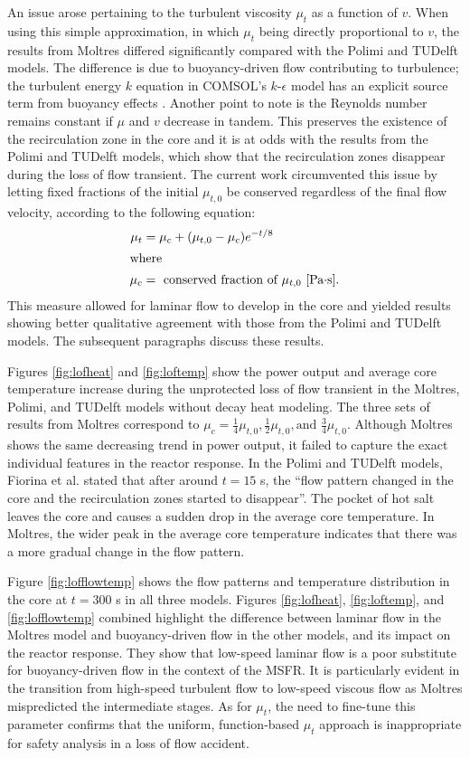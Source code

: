 An issue arose pertaining to the turbulent viscosity $\mu_t$ as a function of
$v$. When using this simple approximation, in which $\mu_t$ being directly
proportional
to $v$, the results from Moltres differed significantly compared with the
Polimi and TUDelft models. The difference is due to buoyancy-driven flow
contributing to turbulence; the turbulent energy $k$ equation in COMSOL's
$k$-$\epsilon$ model has an explicit source term from buoyancy effects
\cite{comsol_ab_comsol_2018}. Another point to note is the
Reynolds number remains constant if $\mu$ and $v$ decrease in tandem. This
preserves the existence of the recirculation zone in the core and it is at
odds with the results from the Polimi and TUDelft models, which show that the
recirculation zones disappear during the loss of flow transient. The current
work circumvented this issue by letting fixed fractions of the initial
$\mu_{t,0}$ be conserved regardless of the final flow velocity, according to
the following equation:
%
\begin{align}
    \mu_t &= \mu_c + (\mu_{t,0} - \mu_c) e^{-t/8} \label{lofmu} \\
    \intertext{where}
    \mu_c &= \text{ conserved fraction of $\mu_{t,0}$ [Pa$\cdot$s].} \nonumber
\end{align}
%
This measure allowed for laminar flow to develop in the core and yielded
results showing better qualitative agreement with those from the Polimi and
TUDelft models. The subsequent paragraphs discuss these results.

Figures \ref{fig:lofheat} and \ref{fig:loftemp} show the power output and
average core temperature increase during the unprotected loss of flow
transient in the Moltres, Polimi, and TUDelft models without decay heat
modeling. The three sets of results from Moltres correspond to $\mu_c =
\frac{1}{4} \mu_{t,0}, \frac{1}{2} \mu_{t,0}, \text{and } \frac{3}{4}
\mu_{t,0}$.
Although Moltres shows the same decreasing trend in power output, it failed to
capture the exact individual features in the reactor response. In the Polimi 
and TUDelft models, Fiorina et al. \cite{fiorina_modelling_2014}
stated that after around $t=15$ s, the ``flow pattern changed in the core and
the recirculation zones started to disappear''. The pocket of hot salt leaves
the core and causes a sudden drop in the average core temperature. In Moltres,
the wider peak in the average core temperature
indicates that there was a more gradual change in the flow pattern.

Figure \ref{fig:lofflowtemp} shows the flow patterns and temperature
distribution in the core at $t=300$ s in all three models. Figures
\ref{fig:lofheat}, \ref{fig:loftemp}, and \ref{fig:lofflowtemp} combined
highlight the difference between laminar flow in the Moltres model and
buoyancy-driven flow in the other models, and its impact on the reactor
response. They show that low-speed laminar flow is a poor substitute for
buoyancy-driven flow in the context of the MSFR. It is particularly evident
in the transition from high-speed turbulent flow to low-speed viscous
flow as Moltres mispredicted the intermediate stages. As for $\mu_t$, the need
to fine-tune this parameter confirms that the uniform, function-based $\mu_t$
approach is inappropriate for safety analysis in a loss of flow accident.

